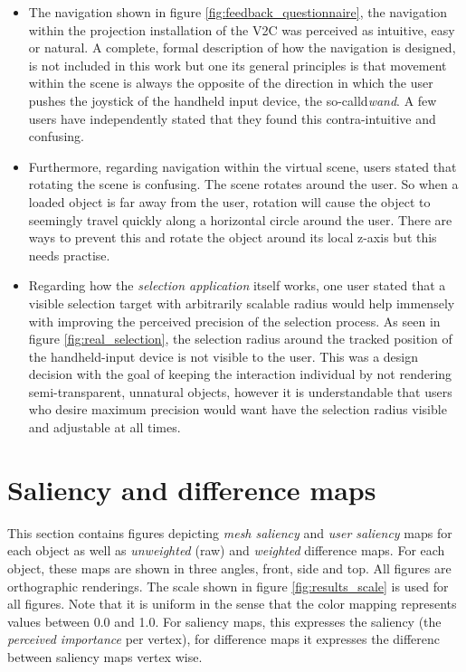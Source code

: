 \begin{itemize}
	\item The navigation shown in figure \ref{fig:feedback_questionnaire}, the navigation within the projection installation of the V2C was perceived as intuitive, easy or natural. A complete, formal description of how the navigation is designed, is not included in this work but one its general principles is that movement within the scene is always the opposite of the direction in which the user pushes the joystick of the handheld input device, the so-calld\textit{wand}. A few users have independently stated that they found this contra-intuitive and confusing.
	\item Furthermore, regarding navigation within the virtual scene, users stated that rotating the scene is confusing. The scene rotates around the user. So when a loaded object is far away from the user, rotation will cause the object to seemingly travel quickly along a horizontal circle around the user. There are ways to prevent this and rotate the object around its local z-axis but this needs practise.
	\item Regarding how the \textit{selection application} itself works, one user stated that a visible selection target with arbitrarily scalable radius would help immensely with improving the perceived precision of the selection process. As seen in figure \ref{fig:real_selection}, the selection radius around the tracked position of the handheld-input device is not visible to the user. This was a design decision with the goal of keeping the interaction individual by not rendering semi-transparent, unnatural objects, however it is understandable that users who desire maximum precision would want have the selection radius visible and adjustable at all times.
\end{itemize}

	\section{Saliency and difference maps}
	\label{sec:saliency_and_difference_maps}
This section contains figures depicting \textit{mesh saliency} and \textit{user saliency} maps for each object as well as \textit{unweighted} (raw) and \textit{weighted} difference maps. For each object, these maps are shown in three angles, front, side and top. All figures are orthographic renderings. The scale shown in figure \ref{fig:results_scale} is used for all figures. Note that it is uniform in the sense that the color mapping represents values between 0.0 and 1.0. For saliency maps, this expresses the saliency (the \textit{perceived importance} per vertex), for difference maps it expresses the differenc between saliency maps vertex wise.


